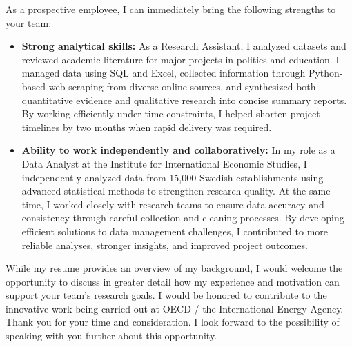\documentclass[11pt,a4paper,roman]{moderncv}
\begin{document}
As a prospective employee, I can immediately bring the following strengths to your team:
\vspace{0.5em}
\begin{itemize}
\item \textbf{Strong analytical skills:} As a Research Assistant, I analyzed datasets and reviewed academic literature for major projects in politics and education. I managed data using SQL and Excel, collected information through Python-based web scraping from diverse online sources, and synthesized both quantitative evidence and qualitative research into concise summary reports. By working efficiently under time constraints, I helped shorten project timelines by two months when rapid delivery was required.
\item \textbf{Ability to work independently and collaboratively:} In my role as a Data Analyst at the Institute for International Economic Studies, I independently analyzed data from 15,000 Swedish establishments using advanced statistical methods to strengthen research quality. At the same time, I worked closely with research teams to ensure data accuracy and consistency through careful collection and cleaning processes. By developing efficient solutions to data management challenges, I contributed to more reliable analyses, stronger insights, and improved project outcomes.
\end{itemize}

\vspace{1em}
While my resume provides an overview of my background, I would welcome the opportunity to discuss in greater detail how my experience and motivation can support your team's research goals. I would be honored to contribute to the innovative work being carried out at OECD / the International Energy Agency.\\

\vspace{1em}
Thank you for your time and consideration. I look forward to the possibility of speaking with you further about this opportunity.

\vspace{0.5cm}


\makeletterclosing
\end{document}
